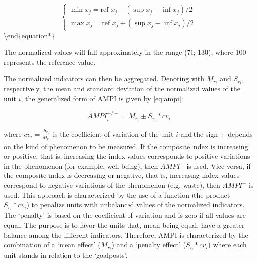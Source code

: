 \documentclass[
]{svmono}
\begin{document}
\begin{equation*}
    \begin{cases}
      \min x_j= \text{ref } x_j - (\sup x_j - \inf x_j)/2\\
      \max x_j= \text{ref } x_j + (\sup x_j - \inf x_j)/2
    \end{cases}\
\label{eq:goals}
\end{equation*}\textbackslash end\{equation*\}

The normalized values will fall approximately in the range (70; 130),
where 100 represents the reference value.

The normalized indicators can then be aggregated. Denoting with
\(M_{r_i}\) and \(S_{r_i}\), respectively, the mean and standard deviation
of the normalized values of the unit \(i\), the generalized form of AMPI
is given by \eqref{eq:ampi}:

\begin{equation}
AMPI_i^{+/-}=M_{r_i} \pm S_{r_i}*cv_i
\label{eq:ampi}
\end{equation}

where \(cv_i=\frac{S_{r_i}}{M_{r_i}}\) is the coefficient of variation of the
unit \(i\) and the sign \(\pm\) depends on the kind of phenomenon to be
measured. If the composite index is increasing or positive, that is,
increasing the index values corresponds to positive variations in the
phenomenon (for example, well-being), then \(AMPI^-\) is used. Vice versa,
if the composite index is decreasing or negative, that is, increasing
index values correspond to negative variations of the phenomenon (e.g.
waste), then \(AMPI^+\) is used. This approach is characterized by the use
of a function (the product \(S_{r_i}*cv_i\)) to penalize units with
unbalanced values of the normalized indicators. The `penalty' is based
on the coefficient of variation and is zero if all values are equal. The
purpose is to favor the units that, mean being equal, have a greater
balance among the different indicators. Therefore, AMPI is characterized
by the combination of a `mean effect' (\(M_{r_i}\)) and a `penalty effect'
(\(S_{r_i}*cv_i\)) where each unit stands in relation to the `goalposts'.
\end{document}
